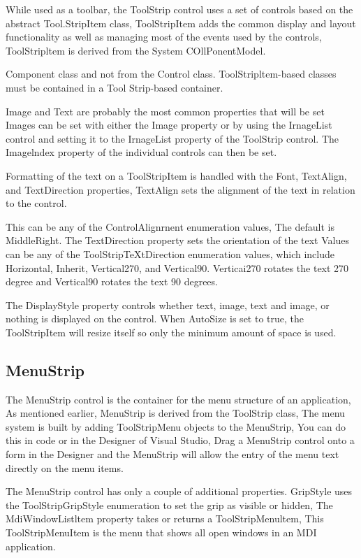 While used as a toolbar, the ToolStrip control uses a set of controls based on the abstract Tool.StripItem class, ToolStripItem adds the common display and layout functionality as well as managing most of the events used by the controls, ToolStripltem is derived from the System COllPonentModel.

Component class and not from the Control class. ToolStripltem-based classes must be contained in a Tool Strip-based container.

Image and Text are probably the most common properties that will be set Images can be set with either the Image property or by using the IrnageList control and setting it to the IrnageList property of the ToolStrip control. The Imagelndex property of the individual controls can then be set.

Formatting of the text on a ToolStripItem is handled with the Font, TextAlign, and TextDirection properties, TextAlign sets the alignment of the text in relation to the control.

This can be any of the ControlAlignrnent enumeration values, The default is MiddleRight. The TextDirection property sets the orientation of the text Values can be any of the ToolStripTeXtDirection enumeration values, which include Horizontal, Inherit, Vertical270, and Vertical90. Verticai270 rotates the text 270 degree and Vertical90 rotates the text 90 degrees.

The DisplayStyle property controls whether text, image, text and image, or nothing is displayed on the control. When AutoSize is set to true, the ToolStripItem will resize itself so only the minimum amount of space is used.

\subsection{MenuStrip}
The MenuStrip control is the container for the menu structure of an application, As mentioned earlier, MenuStrip is derived from the ToolStrip class, The menu system is built by adding ToolStripMenu objects to the MenuStrip, You can do this in code or in the Designer of Visual Studio, Drag a MenuStrip control onto a form in the Designer and the MenuStrip will allow the entry of the menu text directly on the menu items.

The MenuStrip control has only a couple of additional properties. GripStyle uses the ToolStripGripStyle enumeration to set the grip as visible or hidden, The MdiWindowListltem property takes or returns a ToolStripMenultem, This ToolStripMenuItem is the menu that shows all open windows in an MDI application.

